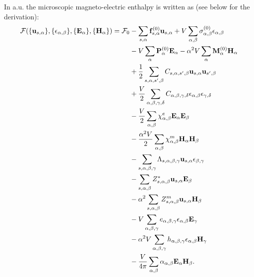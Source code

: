 \documentclass[12pt,a4paper]{article}
\begin{document}
\newpage
{\color{web-blue} In a.u. the microscopic magneto-electric enthalpy
is written as (see below for the derivation):
\begin{align}
\mathcal{F}(\{{\bf u}_{s,\alpha}\}, \{\epsilon_{\alpha,\beta}\},
\{ {\bf E}_\alpha\}, \{{\bf H}_\alpha\})=\mathcal{F}_0 &-
\sum_{s,\alpha} {\bf f}^{(0)}_{s,\alpha} {\bf u}_{s,\alpha}
+ V \sum_{\alpha,\beta}
\sigma_{\alpha,\beta}^{(0)} \epsilon_{\alpha,\beta} \nonumber \\ 
&- V \sum_{\alpha} {\bf P}^{(0)}_\alpha {\bf E}_\alpha - 
\alpha^2 V \sum_{\alpha}
{\bf M}^{(0)}_\alpha {\bf H}_\alpha \nonumber \\
&+ {1\over 2}
\sum_{s,\alpha,s',\beta} C_{s,\alpha,s',\beta} {\bf u}_{s,\alpha}
{\bf u}_{s',\beta}\nonumber \\
&+ {V\over 2}\sum_{\alpha,\beta,\gamma,\delta} 
C_{\alpha,\beta,\gamma,\delta}  
\epsilon_{\alpha,\beta}
\epsilon_{\gamma,\delta} \nonumber \\
&- {V\over 2} \sum_{\alpha,\beta} 
\chi^e_{\alpha,\beta}
{\bf E}_{\alpha}
{\bf E}_{\beta} \nonumber \\
&- {\alpha^2 V \over 2}  \sum_{\alpha,\beta} 
\chi^m_{\alpha,\beta}
{\bf H}_{\alpha}
{\bf H}_{\beta} \nonumber \\
&- \sum_{s,\alpha,\beta,\gamma}
\Lambda_{s,\alpha,\beta,\gamma} {\bf u}_{s,\alpha}
\epsilon_{\beta,\gamma}\nonumber \\
&- \sum_{s,\alpha,\beta} Z^*_{s,\alpha,\beta} 
{\bf u}_{s,\alpha} {\bf E}_{\beta} \nonumber \\
&- \alpha^2 \sum_{s,\alpha,\beta} 
Z^m_{s,\alpha,\beta} {\bf u}_{s,\alpha}{\bf H}_{\beta} \nonumber \\
&- V \sum_{\alpha,\beta,\gamma} e_{\alpha,\beta,\gamma} 
\epsilon_{\alpha,\beta} {\bf E}_{\gamma} \nonumber \\
&- \alpha^2 V \sum_{\alpha,\beta,\gamma}  h_{\alpha,\beta,\gamma} 
\epsilon_{\alpha,\beta} {\bf H}_{\gamma} \nonumber \\
&- {V \over 4 \pi} \sum_{\alpha,\beta} 
\alpha_{\alpha,\beta} {\bf E}_{\alpha}
{\bf H}_{\beta}.
\end{align}
}
\end{document}
